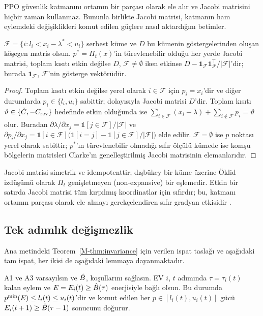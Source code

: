PPO güvenlik katmanını ortamın bir parçası olarak ele alır ve Jacobi matrisini hiçbir zaman kullanmaz.
Bununla birlikte Jacobi matrisi, katmanın ham eylemdeki değişiklikleri komut edilen güçlere nasıl aktardığını betimler.

\begin{proposition}\label{prop:jacobian}
$\mathcal F=\{i:l_i<x_i-\lambda^{*}<u_i\}$ serbest küme ve $D$ bu kümenin göstergelerinden oluşan köşegen matris olsun.
$p^{*}=\Pi_t(x)$'in türevlenebilir olduğu her yerde Jacobi matrisi, toplam kısıtı etkin değilse $D$, $\mathcal F\neq\emptyset$ iken etkinse $D-\mathbf 1_{\mathcal F}\mathbf 1_{\mathcal F}^\top/|\mathcal F|$'dir; burada $\mathbf 1_{\mathcal F}$, $\mathcal F$'nin gösterge vektörüdür.
\end{proposition}

\begin{proof}
Toplam kısıtı etkin değilse yerel olarak $i\in\mathcal F$ için $p_i=x_i$'dir ve diğer durumlarda $p_i\in\{l_i,u_i\}$ sabittir; dolayısıyla Jacobi matrisi $D$'dir.
Toplam kısıtı $\vartheta\in\{\tilde C,-C_{\mathrm{rev}}\}$ hedefinde etkin olduğunda ise $\sum_{i\in\mathcal F}(x_i-\lambda)+\sum_{i\notin\mathcal F}p_i=\vartheta$ olur.
Buradan $\partial\lambda/\partial x_j=\mathbb 1[j\in\mathcal F]/|\mathcal F|$ ve $\partial p_i/\partial x_j=\mathbb 1[i\in\mathcal F]\big(\mathbb 1[i=j]-\mathbb 1[j\in\mathcal F]/|\mathcal F|\big)$ elde edilir.
$\mathcal F=\emptyset$ ise $p$ noktası yerel olarak sabittir; $p^{*}$'ın türevlenebilir olmadığı sıfır ölçülü kümede ise komşu bölgelerin matrisleri Clarke'ın genelleştirilmiş Jacobi matrisinin elemanlarıdır.
\end{proof}

Jacobi matrisi simetrik ve idempotenttir; dışbükey bir küme üzerine Öklid izdüşümü olarak $\Pi_t$ genişletmeyen (non-expansive) bir eşlemedir.
Etkin bir satırda Jacobi matrisi tüm kırpılmış koordinatlar için sıfırdır; bu, katmanı ortamın parçası olarak ele almayı gerekçelendiren sıfır gradyan etkisidir \cite{kasaura2023benchmarking}.

\subsection{Tek adımlık değişmezlik}\label{app:onestep}

Ana metindeki Teorem~\ref{M-thm:invariance} için verilen ispat taslağı ve aşağıdaki tam ispat, her ikisi de aşağıdaki lemmaya dayanmaktadır.

\begin{lemma}\label{lem:onestep}
A1 ve A3 varsayılsın ve $\hat B$,  koşullarını sağlasın.
EV $i$, $t$ adımında $\tau=\tau_i(t)$ kalan eylem ve $E=E_i(t)\ge\hat B(\tau)$ enerjisiyle bağlı olsun.
Bu durumda $p^{\min}(E)\le l_i(t)\le u_i(t)$'dir ve komut edilen her $p\in[l_i(t),u_i(t)]$ gücü $E_i(t+1)\ge\hat B(\tau-1)$ sonucunu doğurur.
\end{lemma}

